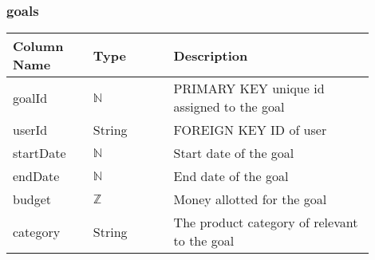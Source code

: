 \documentclass[12pt, titlepage]{article}
\begin{document}
\subsubsection{goals}
\begin{table}[H]
  \begin{tabular}{|p{0.2\linewidth}|p{0.2\linewidth}|p{0.5\linewidth}|}
    \hline
    \textbf{Column Name} & \textbf{Type} & \textbf{Description} \\
    \hline
    goalId & $\mathbb{N}$ & PRIMARY KEY unique id assigned to the goal \\
    \hline
    userId & String & FOREIGN KEY ID of user \\
    \hline
    startDate & $\mathbb{N}$ & Start date of the goal \\
    \hline
    endDate & $\mathbb{N}$ & End date of the goal \\
    \hline
    budget & $\mathbb{Z}$ & Money allotted for the goal \\
    \hline
    category & String & The product category of relevant to the goal\\
    \hline
  \end{tabular}
\end{table}
\end{document}
